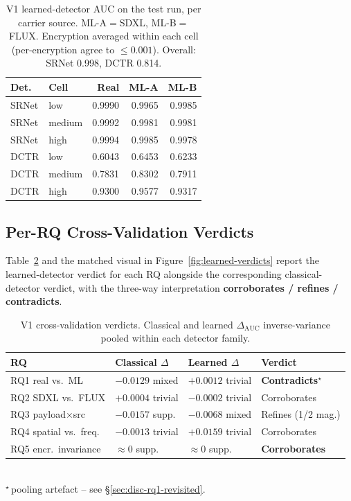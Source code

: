 \documentclass[10pt,twocolumn,a4paper]{article}
\begin{document}
\begin{table}[!htbp]
\centering\footnotesize
\caption{V1 learned-detector AUC on the test run, per carrier source. ML-A$=$SDXL, ML-B$=$FLUX. Encryption averaged within each cell (per-encryption agree to $\leq\!0.001$). Overall: SRNet 0.998, DCTR 0.814.}
\label{tab:learned-headline-auc}
\setlength{\tabcolsep}{5pt}\renewcommand{\arraystretch}{1.05}
\begin{tabular}{@{}llrrr@{}}
\toprule
\textbf{Det.} & \textbf{Cell} & \textbf{Real} & \textbf{ML-A} & \textbf{ML-B} \\
\midrule
SRNet & low     & 0.9990 & 0.9965 & 0.9985 \\
SRNet & medium  & 0.9992 & 0.9981 & 0.9981 \\
SRNet & high    & 0.9994 & 0.9985 & 0.9978 \\
DCTR  & low     & 0.6043 & 0.6453 & 0.6233 \\
DCTR  & medium  & 0.7831 & 0.8302 & 0.7911 \\
DCTR  & high    & 0.9300 & 0.9577 & 0.9317 \\
\bottomrule
\end{tabular}
\end{table}

\subsection{Per-RQ Cross-Validation Verdicts}

Table~\ref{tab:learned-verdicts} and the matched visual in Figure~\ref{fig:learned-verdicts} report the learned-detector verdict for each RQ alongside the corresponding classical-detector verdict, with the three-way interpretation \textbf{corroborates / refines / contradicts}.

\begin{table}[!htbp]
\centering\footnotesize
\caption{V1 cross-validation verdicts. Classical and learned $\Delta_\text{AUC}$ inverse-variance pooled within each detector family.}
\label{tab:learned-verdicts}
\setlength{\tabcolsep}{4pt}\renewcommand{\arraystretch}{1.1}
\begin{tabular}{@{}llll@{}}
\toprule
\textbf{RQ} & \textbf{Classical $\Delta$} & \textbf{Learned $\Delta$} & \textbf{Verdict} \\
\midrule
RQ1 real vs.\ ML        & $-0.0129$ mixed     & $+0.0012$ trivial   & \textbf{Contradicts$^\star$} \\
RQ2 SDXL vs.\ FLUX      & $+0.0004$ trivial   & $-0.0002$ trivial   & Corroborates \\
RQ3 payload$\times$src  & $-0.0157$ supp.     & $-0.0068$ mixed     & Refines (1/2 mag.) \\
RQ4 spatial vs.\ freq.  & $-0.0013$ trivial   & $+0.0159$ trivial   & Corroborates \\
RQ5 encr.\ invariance   & $\approx 0$ supp.   & $\approx 0$ supp.   & \textbf{Corroborates} \\
\bottomrule
\end{tabular}\\[1pt]
{\scriptsize $^\star$\,pooling artefact -- see \S\ref{sec:disc-rq1-revisited}.}
\end{table}
\end{document}
